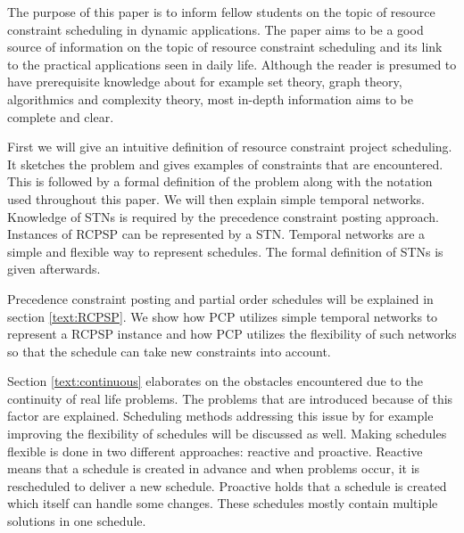 \documentclass{article}
\begin{document}
The purpose of this paper is to inform fellow students on the topic of resource constraint scheduling in dynamic applications.
The paper aims to be a good source of information on the topic of resource constraint scheduling and its link to the practical applications seen in daily life.
Although the reader is presumed to have prerequisite knowledge about for example set theory, graph theory, algorithmics and complexity theory, most in-depth information aims to be complete and clear.

First we will give an intuitive definition of resource constraint project scheduling. 
It sketches the problem and gives examples of constraints that are encountered. 
This is followed by a formal definition of the problem along with the notation used throughout this paper. 
We will then explain simple temporal networks. 
Knowledge of STNs is required by the precedence constraint posting approach. Instances of RCPSP can be represented by a STN. 
Temporal networks are a simple and flexible way to represent schedules.
The formal definition of STNs is given afterwards. 


Precedence constraint posting and partial order schedules will be explained in section \ref{text:RCPSP}. 
We show how PCP utilizes simple temporal networks to represent a RCPSP instance and how PCP utilizes the flexibility of such networks so that the schedule can take new constraints into account. 

Section \ref{text:continuous} elaborates on the obstacles encountered due to the continuity of real life problems. 
The problems that are introduced because of this factor are explained. 
Scheduling methods addressing this issue by for example improving the flexibility of schedules will be discussed as well.
Making schedules flexible is done in two different approaches: reactive and proactive.
Reactive means that a schedule is created in advance and when problems occur, it is rescheduled to deliver a new schedule.
Proactive holds that a schedule is created which itself can handle some changes.
These schedules mostly contain multiple solutions in one schedule.
\end{document}
